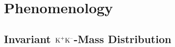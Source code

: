\chapter{Phenomenology}
\label{chap:pheno}






\section{Invariant \texorpdfstring{$\text{K}^\text{+}\text{K}^\text{--}$}{KK}-Mass Distribution}
\label{sec:pheno_KKMass}


